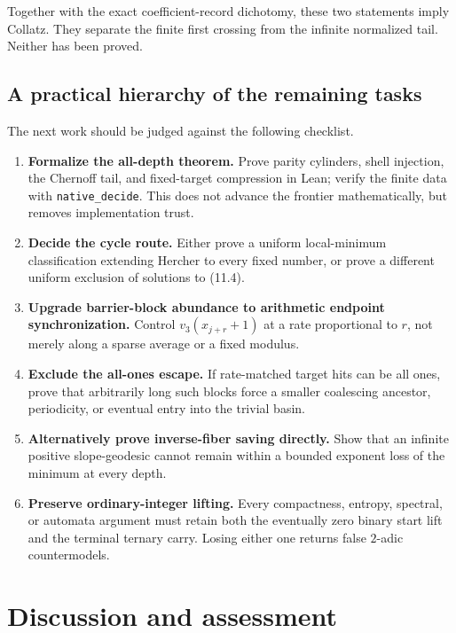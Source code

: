 \documentclass[11pt]{article}
\theoremstyle{definition}
\theoremstyle{remark}
\begin{document}
Together with the exact coefficient-record dichotomy, these two statements
imply Collatz.  They separate the finite first crossing from the infinite
normalized tail.  Neither has been proved.

\subsection{A practical hierarchy of the remaining tasks}

The next work should be judged against the following checklist.

\begin{enumerate}[label=\textbf{D\arabic*.}]
\item \textbf{Formalize the all-depth theorem.}  Prove parity cylinders,
shell injection, the Chernoff tail, and fixed-target compression in Lean;
verify the finite data with \texttt{native\_decide}.  This does not advance
the frontier mathematically, but removes implementation trust.
\item \textbf{Decide the cycle route.}  Either prove a uniform local-minimum
classification extending Hercher to every fixed number, or prove a different
uniform exclusion of solutions to \textup{(11.4)}.
\item \textbf{Upgrade barrier-block abundance to arithmetic endpoint
synchronization.}  Control $v_3(x_{j+r}+1)$ at a rate proportional to $r$,
not merely along a sparse average or a fixed modulus.
\item \textbf{Exclude the all-ones escape.}  If rate-matched target hits can
be all ones, prove that arbitrarily long such blocks force a smaller
coalescing ancestor, periodicity, or eventual entry into the trivial basin.
\item \textbf{Alternatively prove inverse-fiber saving directly.}  Show that
an infinite positive slope-geodesic cannot remain within a bounded exponent
loss of the minimum at every depth.
\item \textbf{Preserve ordinary-integer lifting.}  Every compactness,
entropy, spectral, or automata argument must retain both the eventually zero
binary start lift and the terminal ternary carry.  Losing either one returns
false $2$-adic countermodels.
\end{enumerate}

\section{Discussion and assessment}\label{sec:assessment}
\end{document}
